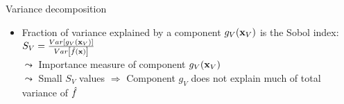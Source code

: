\documentclass[11pt,compress,t,notes=noshow, aspectratio=169, xcolor=table]{beamer}
\newcommand{\open}{}
\newcommand{\close}{}
\begin{document}
\begin{frame}{Variance decomposition}
\begin{itemize}
\item Fraction of variance explained by a component $g_{\open V \close}(\xv_V)$ is the Sobol index:
$
S_V = \frac{Var\left[g_{\open V \close}(\xv_V)\right]}{Var\left[\hat{f}(\xv)\right]}
$\\
$\leadsto$ Importance measure of component $g_{\open V \close}(\xv_V)$\\
$\leadsto$ Small $S_V$ values $\Rightarrow$ Component $g_{\open V \close}$ does not explain much of total variance of $\fh$
\end{itemize}

\end{frame}


\endlecture
\end{document}

